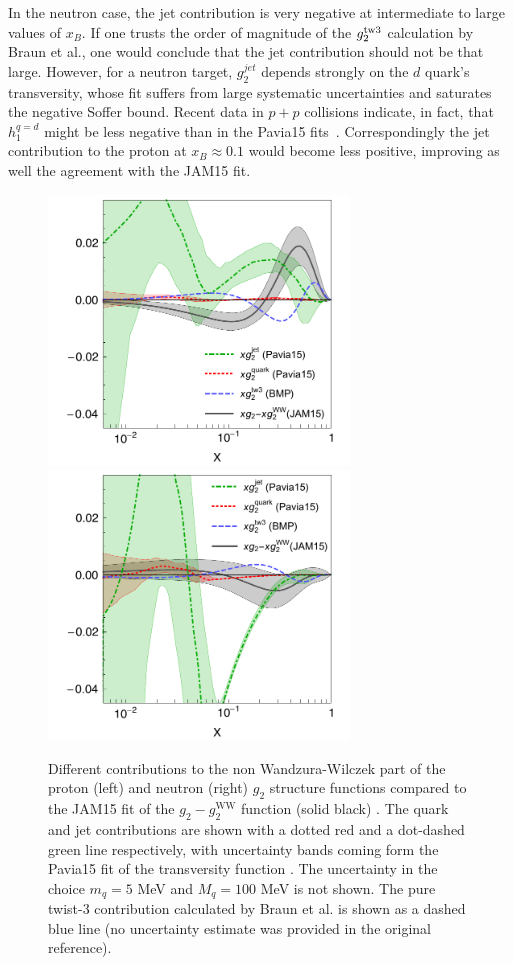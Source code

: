 \documentclass[preprintnumbers,floatfix,nofootinbib]{revtex4}
\newcommand{\xbj}{{x_B}}                   %
\newcommand{\mj}{M_q}
\begin{document}
In the neutron case, the jet contribution is very negative at intermediate to
large values of $\xbj$. 
If one trusts the order of magnitude of the $g_2^{\rm tw3}$
calculation by Braun et al., one would conclude that the jet contribution
should not be that large. However, for a neutron target, $g_2^{jet}$ depends strongly on the $d$ quark's transversity, whose fit suffers from large systematic uncertainties and saturates the negative Soffer bound. Recent data in $p+p$ collisions indicate, in fact, that $h_1^{q=d}$ might be less negative than in the Pavia15 fits~\cite{Radici:2016lam}.
Correspondingly the jet contribution to the proton at $\xbj \approx 0.1$
would become less positive, improving as well the agreement with the JAM15
fit. 

\begin{figure}[htb]
\begin{center}
\includegraphics[width=8cm]{g2contrib.pdf}
\includegraphics[width=8cm]{g2contribN.pdf}
\caption{\label{f:g2contrib} 
Different contributions to the non Wandzura-Wilczek part of the proton (left)
and neutron (right) $g_2$ structure functions compared to the JAM15 fit of the
$g_2-g_2^{\text{WW}}$ function (solid black) \cite{Sato:2016tuz}. The quark and jet
contributions are shown with a dotted red and a dot-dashed green line
respectively, with uncertainty bands coming form the Pavia15 fit of the
transversity function \cite{Radici:2015mwa}. The uncertainty in the choice
$m_q=5$ MeV and $\mj=100$ MeV is not shown. The pure twist-3 contribution
calculated by Braun et al. \cite{Braun:2011aw} is shown as a dashed blue line
(no uncertainty estimate was provided in the original reference). 
}
\end{center}
\end{figure}
\end{document}
